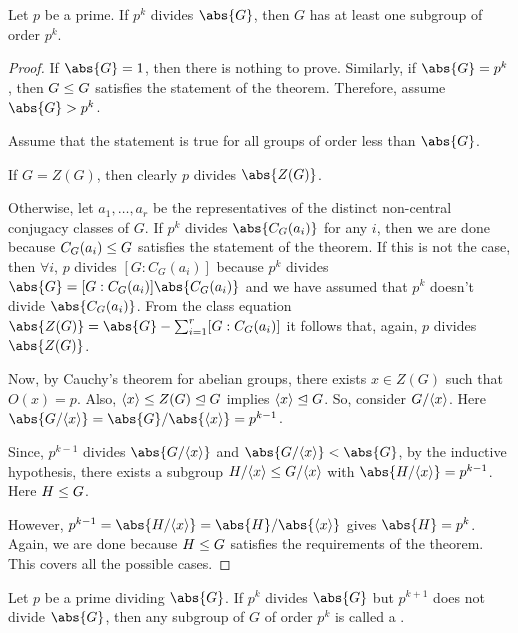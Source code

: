 \documentclass[11pt]{penrose}
\begin{document}
\begin{nthm}
    Let $p$ be a prime. If $p^{k}$ divides $\abs{G}$, then $G$ has at least one subgroup of order $p^{k}$.
\end{nthm}
\begin{proof}
    If $\abs{G} = 1$, then there is nothing to prove. Similarly, if $\abs{G} = p^{k}$, then $G \mathrel{\leq} G$ satisfies the statement of the theorem. Therefore, assume $\abs{G} > p^{k}$.

    Assume that the statement is true for all groups of order less than $\abs{G}$.

    If $G = Z(G)$, then clearly $p$ divides $\abs{Z(G)}$.

    Otherwise, let $a_{1}, \dots, a_{r}$ be the representatives of the distinct non-central conjugacy classes of $G$. If $p^{k}$ divides $\abs{C_{G}(a_{i})}$ for any $i$, then we are done because $C_{G}(a_{i}) \mathrel{\leq} G$ satisfies the statement of the theorem. If this is not the case, then $\forall i$, $p$ divides $[G : C_{G}(a_{i})]$ because $p^{k}$ divides $\abs{G} = [G : C_{G}(a_{i})] \abs{C_{G}(a_{i})}$ and we have assumed that $p^{k}$ doesn't divide $\abs{C_{G}(a_{i})}$. From the class equation $\abs{Z(G)} = \abs{G} - \sum_{i=1}^{r} \comm{G : C_{G}(a_{i})}$ it follows that, again, $p$ divides $\abs{Z(G)}$.

    Now, by Cauchy's theorem for abelian groups, there exists $x \in Z(G)$ such that $O(x) = p$. Also, $\langle x\rangle \mathrel{\leq} Z(G) \mathrel{\trianglelefteq} G$ implies $\langle x\rangle \mathrel{\trianglelefteq} G$. So, consider $G / \langle x\rangle$. Here $\abs{G / \cyclic{x}} = \abs{G} / \abs{\cyclic{x}} = p^{k-1}$.

    Since, $p^{k-1}$ divides $\abs{G / \cyclic{x}}$ and $\abs{G / \cyclic{x}} < \abs{G}$, by the inductive hypothesis, there exists a subgroup $H / \langle x\rangle \mathrel{\leq} G / \langle x\rangle$ with $\abs{H / \cyclic{x}} = p^{k-1}$. Here $H \mathrel{\leq} G$.

    However, $p^{k-1} = \abs{H / \cyclic{x}} = \abs{H} / \abs{\cyclic{x}}$ gives $\abs{H} = p^{k}$. Again, we are done because $H \mathrel{\leq} G$ satisfies the requirements of the theorem. This covers all the possible cases.
\end{proof}

\begin{ndfn}
    Let $p$ be a prime dividing $\abs{G}$. If $p^{k}$ divides $\abs{G}$ but $p^{k+1} $ does not divide $\abs{G}$, then any subgroup of $G$ of order $p^{k}$ is called a .
\end{ndfn}
\end{document}
